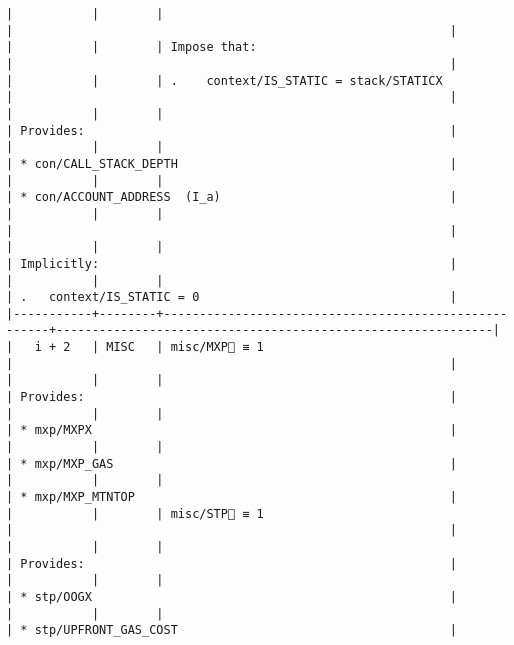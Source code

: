 \documentclass[varwidth=\maxdimen,margin=0.5cm,multi={verbatim}]{standalone}
\begin{document}
\begin{verbatim}
|           |        |                                                      |                                                             |
|           |        | Impose that:                                         |                                                             |
|           |        | .    context/IS_STATIC = stack/STATICX               |                                                             |
|           |        |                                                      | Provides:                                                   |
|           |        |                                                      | * con/CALL_STACK_DEPTH                                      |
|           |        |                                                      | * con/ACCOUNT_ADDRESS  (I_a)                                |
|           |        |                                                      |                                                             |
|           |        |                                                      | Implicitly:                                                 |
|           |        |                                                      | .   context/IS_STATIC = 0                                   |
|-----------+--------+------------------------------------------------------+-------------------------------------------------------------|
|   i + 2   | MISC   | misc/MXP🚩 ≡ 1                                       |                                                             |
|           |        |                                                      | Provides:                                                   |
|           |        |                                                      | * mxp/MXPX                                                  |
|           |        |                                                      | * mxp/MXP_GAS                                               |
|           |        |                                                      | * mxp/MXP_MTNTOP                                            |
|           |        | misc/STP🚩 ≡ 1                                       |                                                             |
|           |        |                                                      | Provides:                                                   |
|           |        |                                                      | * stp/OOGX                                                  |
|           |        |                                                      | * stp/UPFRONT_GAS_COST                                      |

\end{verbatim}
\end{document}
